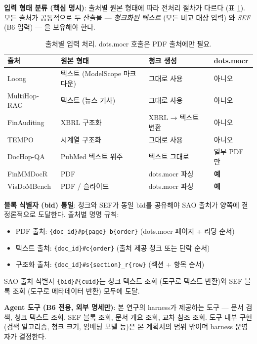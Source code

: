 \documentclass[11pt]{article}
\begin{document}
\textbf{입력 형태 분류 (핵심 명시)}: 출처별 원본 형태에 따라 전처리 절차가 다르다 (표 \ref{tab:preproc-exec}). 모든 출처가 공통적으로 두 산출물 — \emph{청크화된 텍스트} (모든 비교 대상 입력) 와 \emph{SEF} (B6 입력) — 을 보유해야 한다.

\begin{table}[h]
\centering
\small
\begin{tabular}{llll}
\toprule
출처 & 원본 형태 & 청크 생성 & dots.mocr \\
\midrule
Loong & 텍스트 (ModelScope 마크다운) & 그대로 사용 & 아니오 \\
MultiHop-RAG & 텍스트 (뉴스 기사) & 그대로 사용 & 아니오 \\
FinAuditing & XBRL 구조화 & XBRL → 텍스트 변환 & 아니오 \\
TEMPO & 시계열 구조화 & 그대로 사용 & 아니오 \\
DocHop-QA & PubMed 텍스트 위주 & 텍스트 그대로 & 일부 PDF만 \\
FinMMDocR & PDF & dots.mocr 파싱 & \textbf{예} \\
VisDoMBench & PDF / 슬라이드 & dots.mocr 파싱 & \textbf{예} \\
\bottomrule
\end{tabular}
\caption{출처별 입력 처리. dots.mocr 호출은 PDF 출처에만 필요.}
\label{tab:preproc-exec}
\end{table}

\textbf{블록 식별자 (bid) 통일}: 청크와 SEF가 동일 bid를 공유해야 SAO 출처가 양쪽에 결정론적으로 도달한다. 출처별 명명 규칙:
\begin{itemize}[leftmargin=*]
    \item PDF 출처: \texttt{\{doc\_id\}\#p\{page\}\_b\{order\}} (dots.mocr 페이지 + 리딩 순서)
    \item 텍스트 출처: \texttt{\{doc\_id\}\#c\{order\}} (출처 제공 청크 또는 단락 순서)
    \item 구조화 출처: \texttt{\{doc\_id\}\#s\{section\}\_r\{row\}} (섹션 + 항목 순서)
\end{itemize}

SAO 출처 식별자 \texttt{\{bid\}\#\{cuid\}}는 청크 텍스트 조회 (도구로 텍스트 반환)와 SEF 블록 조회 (도구로 메타데이터 반환) 모두에 도달.

\textbf{Agent 도구 (B6 전용, 외부 명세만)}: 본 연구의 harness가 제공하는 도구 — 문서 검색, 청크 텍스트 조회, SEF 블록 조회, 문서 개요 조회, 교차 참조 조회. 도구 내부 구현 (검색 알고리즘, 청크 크기, 임베딩 모델 등)은 본 계획서의 범위 밖이며 harness 운영자가 결정한다.
\end{document}

